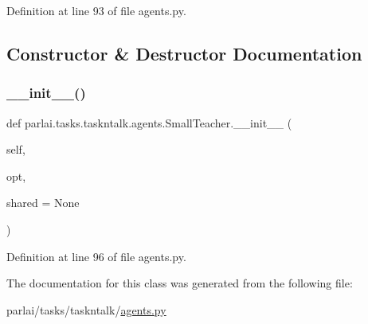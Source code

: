 Definition at line 93 of file agents.\+py.



\subsection{Constructor \& Destructor Documentation}
\mbox{\label{classparlai_1_1tasks_1_1taskntalk_1_1agents_1_1SmallTeacher_a840dfb1bc33447c389006c6b846babe0}} 
\subsubsection{\texorpdfstring{\+\_\+\+\_\+init\+\_\+\+\_\+()}{\_\_init\_\_()}}
{\footnotesize\ttfamily def parlai.\+tasks.\+taskntalk.\+agents.\+Small\+Teacher.\+\_\+\+\_\+init\+\_\+\+\_\+ (\begin{DoxyParamCaption}\item[{}]{self,  }\item[{}]{opt,  }\item[{}]{shared = {\ttfamily None} }\end{DoxyParamCaption})}



Definition at line 96 of file agents.\+py.



The documentation for this class was generated from the following file\+:\begin{DoxyCompactItemize}
\item 
parlai/tasks/taskntalk/\hyperlink{parlai_2tasks_2taskntalk_2agents_8py}{agents.\+py}\end{DoxyCompactItemize}
